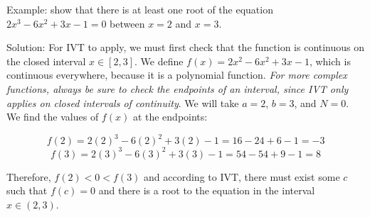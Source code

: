 Example: show that there is at least one root of the equation $2x^3-6x^2+3x-1=0$ between $x=2$ and $x=3$.

Solution: For IVT to apply, we must first check that the function is continuous on the closed interval $x \in \left[2, 3\right]$. We define $f(x) = 2x^2-6x^2+3x-1$, which is continuous everywhere, because it is a polynomial function. \textit{For more complex functions, always be sure to check the endpoints of an interval, since IVT only applies on closed intervals of continuity}. We will take $a=2$, $b=3$, and $N=0$. We find the values of $f(x)$ at the endpoints: 

$$f(2)=2(2)^3-6(2)^2+3(2)-1 = 16-24+6-1=-3$$
$$f(3)=2(3)^3-6(3)^2+3(3)-1=54-54+9-1=8$$

Therefore, $f(2)<0<f(3)$ and according to IVT, there must exist some $c$ such that $f(c)=0$ and there is a root to the equation in the interval $x \in \left(2, 3\right)$.

